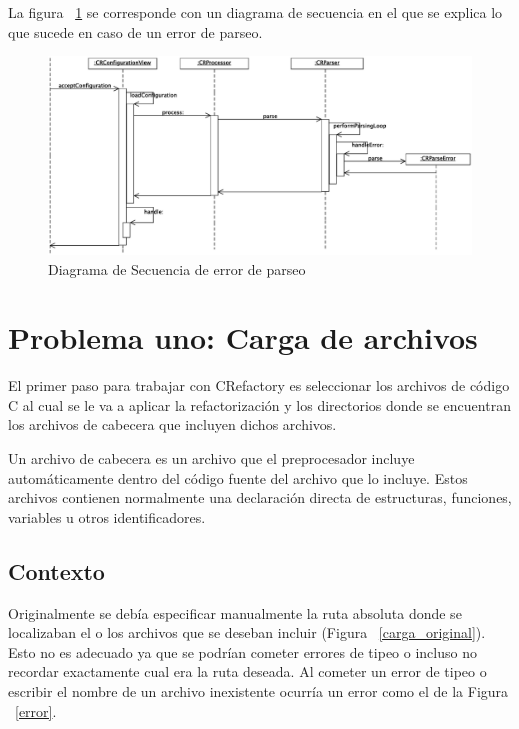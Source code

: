\documentclass[a4paper,oneside,12pt]{article}
\begin{document}
La figura ~\ref{diagrama_de_secuencia_parser_error} se corresponde con un diagrama de secuencia en el que se explica lo que sucede en caso de un error de parseo.

\begin{figure}[htbp]
  \centering
  \includegraphics[scale=0.40, angle=270]{images/secuencia_parser_error.eps}
  \caption{Diagrama de Secuencia de error de parseo}
  \label{diagrama_de_secuencia_parser_error}
\end{figure}

\clearpage

\section{Problema uno: Carga de archivos}
\label{sec:problema_uno}

El primer paso para trabajar con CRefactory es seleccionar los archivos de c\'odigo C al cual se le va a aplicar la refactorizaci\'on y los directorios donde se encuentran los archivos de cabecera que incluyen dichos archivos.

Un archivo de cabecera es un archivo que el preprocesador incluye autom\'aticamente dentro del c\'odigo fuente del archivo que lo incluye. Estos archivos contienen normalmente una declaraci\'on directa de estructuras, funciones, variables u otros identificadores.


\subsection{Contexto}
Originalmente se deb\'ia especificar manualmente la ruta absoluta donde se localizaban el o los archivos que se deseban incluir (Figura ~\ref{carga_original}). Esto no es adecuado ya que se podr\'ian cometer errores de tipeo o incluso no recordar exactamente cual era la ruta deseada.
Al cometer un error de tipeo o escribir el nombre de un archivo inexistente ocurr\'ia un error como el de la Figura ~\ref{error}.
\end{document}
